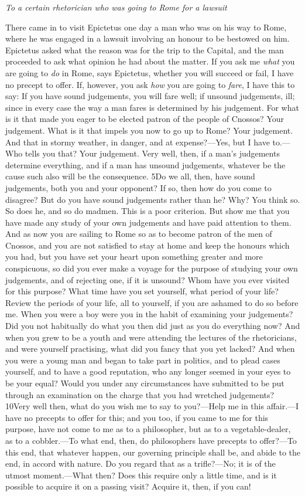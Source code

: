 \emph{To a certain rhetorician who was going to Rome for a lawsuit}

There came in to visit Epictetus one day a man who was on his way to Rome, where he was engaged in a lawsuit involving an honour to be bestowed on him. Epictetus asked what the reason was for the trip to the Capital, and the man proceeded to ask what opinion he had about the matter. If you ask me \emph{what} you are going to \emph{do} in Rome, says Epictetus, whether you will succeed or fail, I have no precept to offer. If, however, you ask \emph{how} you are going to \emph{fare}, I have this to say: If you have sound judgements, you will fare well; if unsound judgements, ill; since in every case the way a man fares is determined by his judgement. For what is it that made you eager to be elected patron of the people of Cnossos? Your judgement. What is it that impels you now to go up to Rome? Your judgement. And that in stormy weather, in danger, and at expense?—Yes, but I have to.—Who tells you that? Your judgement. Very well, then, if a man's judgements determine everything, and if a man has unsound judgements, whatever be the cause such also will be the consequence. 5Do we all, then, have sound judgements, both you and your opponent? If so, then how do you come to disagree? But do you have sound judgements rather than he? Why? You think so. So does he, and so do madmen. This is a poor criterion. But show me that you have made any study of your own judgements and have paid attention to them. And as now you are sailing to Rome so as to become patron of the men of Cnossos, and you are not satisfied to stay at home and keep the honours which you had, but you have set your heart upon something greater and more conspicuous, so did you ever make a voyage for the purpose of studying your own judgements, and of rejecting one, if it is unsound? Whom have you ever visited for this purpose? What time have you set yourself, what period of your life? Review the periods of your life, all to yourself, if you are ashamed to do so before me. When you were a boy were you in the habit of examining your judgements? Did you not habitually do what you then did just as you do everything now? And when you grew to be a youth and were attending the lectures of the rhetoricians, and were yourself practising, what did you fancy that you yet lacked? And when you were a young man and began to take part in politics, and to plead cases yourself, and to have a good reputation, who any longer seemed in your eyes to be your equal? Would you under any circumstances have submitted to be put through an examination on the charge that you had wretched judgements? 10Very well then, what do you wish me to say to you?—Help me in this affair.—I have no precepts to offer for this; and you too, if you came to me for this purpose, have not come to me as to a philosopher, but as to a vegetable-dealer, as to a cobbler.—To what end, then, do philosophers have precepts to offer?—To this end, that whatever happen, our governing principle shall be, and abide to the end, in accord with nature. Do you regard that as a trifle?—No; it is of the utmost moment.—What then? Does this require only a little time, and is it possible to acquire it on a passing visit? Acquire it, then, if you can!

